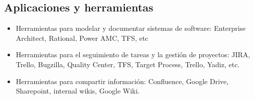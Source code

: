 \documentclass[11pt,a4paper,sans]{moderncv}
\begin{document}



\subsection{Aplicaciones y herramientas}

\begin{itemize}
  \item Herramientas para modelar y documentar sistemas de software: Enterprise Architect, Rational, Power AMC, TFS, etc
  \item Herramientas para el seguimiento de tareas y la gestión de proyectos: JIRA, Trello, Bugzilla, Quality Center, TFS, Target Process, Trello, Yadiz, etc.
  \item Herramientas para compartir información: Confluence, Google Drive, Sharepoint, internal wikis, Google Wiki.

\end{itemize}

\clearpage
\end{document}
